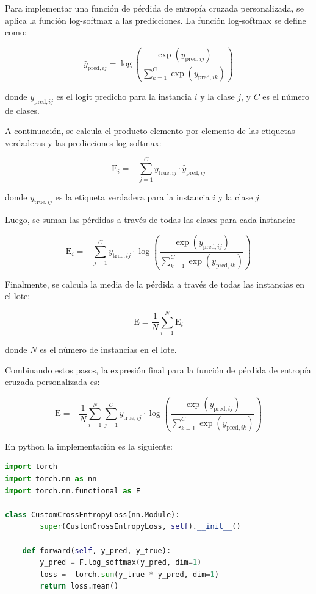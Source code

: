 Para implementar una función de pérdida de entropía cruzada personalizada, se aplica la función log-softmax a las predicciones. La función log-softmax se define como:

\[
\hat{y}_{\text{pred},ij} = \log \left( \frac{\exp(y_{\text{pred},ij})}{\sum_{k=1}^{C} \exp(y_{\text{pred},ik})} \right)
\]

donde \( y_{\text{pred},ij} \) es el logit predicho para la instancia \( i \) y la clase \( j \), y \( C \) es el número de clases.

A continuación, se calcula el producto elemento por elemento de las etiquetas verdaderas y las predicciones log-softmax:

\[
\text{E}_i = -\sum_{j=1}^{C} y_{\text{true},ij} \cdot \hat{y}_{\text{pred},ij}
\]

donde \( y_{\text{true},ij} \) es la etiqueta verdadera para la instancia \( i \) y la clase \( j \).

Luego, se suman las pérdidas a través de todas las clases para cada instancia:

\[
\text{E}_i = -\sum_{j=1}^{C} y_{\text{true},ij} \cdot \log \left( \frac{\exp(y_{\text{pred},ij})}{\sum_{k=1}^{C} \exp(y_{\text{pred},ik})} \right)
\]

Finalmente, se calcula la media de la pérdida a través de todas las instancias en el lote:

\[
\text{E} = \frac{1}{N} \sum_{i=1}^{N} \text{E}_i
\]

donde \( N \) es el número de instancias en el lote.

Combinando estos pasos, la expresión final para la función de pérdida de entropía cruzada personalizada es:

\[
\text{E} = -\frac{1}{N} \sum_{i=1}^{N} \sum_{j=1}^{C} y_{\text{true},ij} \cdot \log \left( \frac{\exp(y_{\text{pred},ij})}{\sum_{k=1}^{C} \exp(y_{\text{pred},ik})} \right)
\]

En python la implementación es la siguiente: 
\begin{lstlisting}[language=python]
import torch
import torch.nn as nn
import torch.nn.functional as F

class CustomCrossEntropyLoss(nn.Module):
        super(CustomCrossEntropyLoss, self).__init__()
    
    def forward(self, y_pred, y_true):
        y_pred = F.log_softmax(y_pred, dim=1)
        loss = -torch.sum(y_true * y_pred, dim=1)
        return loss.mean()
\end{lstlisting}

